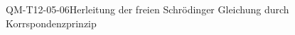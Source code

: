 
\begin{CONC}{QM-T12-05-06}{Herleitung der freien Schrödinger Gleichung durch Korrspondenzprinzip}
\end{CONC}
